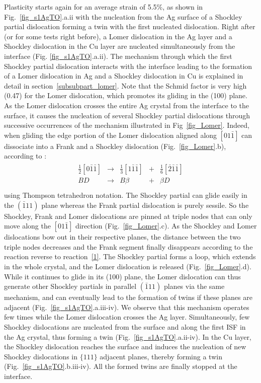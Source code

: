 \documentclass[final,3p,times,twocolumn]{elsarticle}
\begin{document}
Plasticity starts again for an average strain of 5.5\%, as shown in Fig.~\ref{fig_s1AgTO}.a.ii with the nucleation from the Ag surface of a Shockley partial dislocation forming a twin with the first nucleated dislocation. Right after (or for some tests right before), a Lomer dislocation in the Ag layer and a Shockley dislocation in the Cu layer are nucleated simultaneously from the interface (Fig. \ref{fig_s1AgTO}.a.ii). The mechanism through which the first Shockley partial dislocation interacts with the interface leading to the formation of a Lomer dislocation in Ag and a Shockley dislocation in Cu is explained in detail in section~\ref{subsubpart_lomer}. 
Note that the Schmid factor is very high (0.47) for the Lomer dislocation, which promotes its gliding in the (100) plane.
As the Lomer dislocation crosses the entire Ag crystal from the interface to the surface, it causes the nucleation of several Shockley partial dislocations through successive occurrences of the mechanism illustrated in Fig~\ref{fig_Lomer}. Indeed, when gliding the edge portion of the Lomer dislocation aligned along $\left[01\bar{1}\right]$ can dissociate into a Frank and a Shockley dislocation (Fig.~\ref{fig_Lomer}.b), according to \cite{wu09AM}:
\begin{eqnarray}\label{1}
	\begin{array}{ccccc}
\frac{1}{2}\left[0\bar{1}\bar{1}\right] &\rightarrow &  \frac{1}{3}\left[1\bar{1}\bar{1}\right]&+& \frac{1}{6}\left[\bar{2}\bar{1}\bar{1}\right] \\
BD &\rightarrow &  B\beta &+& \beta D\\
	\end{array}
\end{eqnarray} 
using Thompson tetrahedron notation. 
The Shockley partial can glide easily in the $\left(\bar{1}11\right)$ plane whereas the Frank partial dislocation is purely sessile. So the Shockley, Frank and Lomer dislocations are pinned at triple nodes that can only move along the $\left[01\bar{1}\right]$ direction (Fig.~\ref{fig_Lomer}.c). As the Shockley and Lomer dislocations bow out in their respective planes, the distance between the two triple nodes decreases and the Frank segment finally disappears according to the reaction reverse to reaction~\ref{1}. The Shockley partial forms a loop, which extends in the whole crystal, and the Lomer dislocation is released (Fig.~\ref{fig_Lomer}.d). While it continues to glide in its (100) plane, the Lomer dislocation can thus generate other Shockley partials in parallel $\left(\bar{1}11\right)$ planes via the same mechanism, and can eventually lead to the formation of twins if these planes are adjacent (Fig.~\ref{fig_s1AgTO}.a.iii-iv). We observe that this mechanism operates few times while the Lomer dislocation crosses the Ag layer. Simultaneously, few Shockley dislocations are nucleated from the surface and along the first ISF in the Ag crystal, thus forming a twin (Fig.~\ref{fig_s1AgTO}.a.ii-iv). In the Cu layer, the Shockley dislocation reaches the surface and induces the nucleation of new Shockley dislocations in $\lbrace111\rbrace$ adjacent planes, thereby forming a twin (Fig.~\ref{fig_s1AgTO}.b.iii-iv). All the formed twins are finally stopped at the interface.
\end{document}
